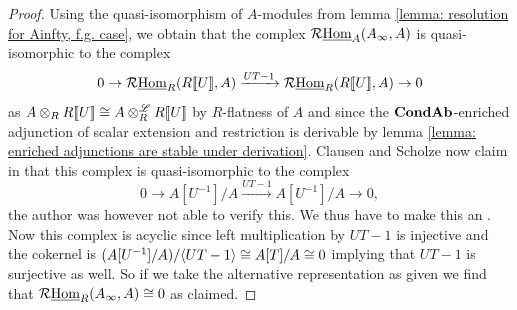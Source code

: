 \begin{proof}
	Using the quasi-isomorphism of $A$-modules from lemma \ref{lemma: resolution for Ainfty, f.g. case}, we obtain that the complex $\mathcal{R}{\underline{\operatorname{Hom}}}_A(A_\infty, A)$ is quasi-isomorphic to the complex
	$$0\to \mathcal{R}{\underline{\operatorname{Hom}}}_R({R[\![U]\!]}, A) \xrightarrow{UT-1} \mathcal{R}{\underline{\operatorname{Hom}}}_R({R[\![U]\!]}, A)\to 0$$
	as $A\otimes_R {R[\![U]\!]} \cong A\otimes^{\mathscr{L}}_R {R[\![U]\!]}$ by $R$-flatness of $A$ and since the ${{{\mathbf{Cond}}}{{\mathbf{Ab}}}}$-enriched adjunction of scalar extension and restriction is derivable by lemma \ref{lemma: enriched adjunctions are stable under derivation}. Clausen and Scholze now claim in \cite[Observation 8.8, p.55]{condenseddotpdf} that this complex is quasi-isomorphic to the complex
		$$0\to A[U^{-1}]/A \xrightarrow{UT-1} A[U^{-1}]/A\to 0,$$
	the author was however not able to verify this. We thus have to make this an \assumptionPreWord. Now this complex is acyclic since left multiplication by $UT-1$ is injective and the cokernel is $(A[U^{-1}]/A)/{\langle UT-1\rangle}\cong A[T]/A\cong 0$ implying that $UT-1$ is surjective as well. So if we take the alternative representation as given we find that $\mathcal{R}{\underline{\operatorname{Hom}}}_R(A_\infty, A) \cong 0$ as claimed.
	

\end{proof}
